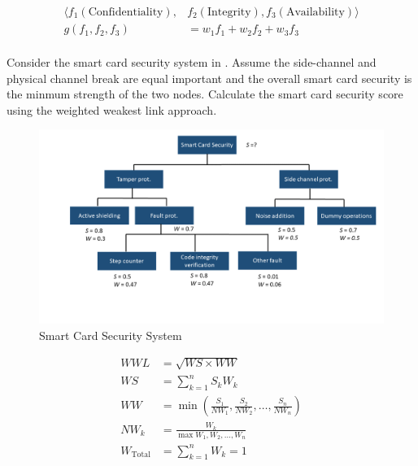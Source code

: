 \begin{questions}
\begin{parts}
\begin{solution}
      \begin{equation}\label{eq:CIA_Functions}
        \begin{aligned}
          \langle f_{1}(\text{Confidentiality}), &f_{2}(\text{Integrity}), f_{3}(\text{Availability}) \rangle \\
          g(f_{1}, f_{2}, f_{3}) &= w_{1} f_{1} + w_{2}f_{2} + w_{3}f_{3} \\
        \end{aligned}
      \end{equation}
    \end{solution}
  \end{parts}

\question{} Consider the smart card security system in .
  Assume the side-channel and physical channel break are equal important and the overall smart card security is the minmum strength of the two nodes.
  Calculate the smart card security score using the weighted weakest link approach.
  \begin{figure}[h!]
    \centering
    \includegraphics[scale=0.35]{./Drawings/EITP20-Secure_Systems_Engineering/Smart_Card_Security_System.png}
    \caption{Smart Card Security System}
    \label{fig:Smart_Card_Security_System}
  \end{figure}
  \begin{solution}
    \begin{equation}\label{eq:Weighted_Weakest_Link}
      \begin{aligned}
        WWL &= \sqrt{WS \times WW} \\
        WS &= \sum\limits_{k=1}^{n} S_{k}W_{k} \\
        WW &= \min \left( \frac{S_{1}}{NW_{1}}, \frac{S_{2}}{NW_{2}}, \ldots, \frac{S_{n}}{NW_{n}} \right) \\
        NW_{k} &= \frac{W_{k}}{\max{W_{1}, W_{2}, \ldots, W_{n}}} \\
        W_{\mathrm{Total}} &= \sum\limits_{k=1}^{n} W_{k} = 1
      \end{aligned}
    \end{equation}
  \end{solution}


\end{questions}
